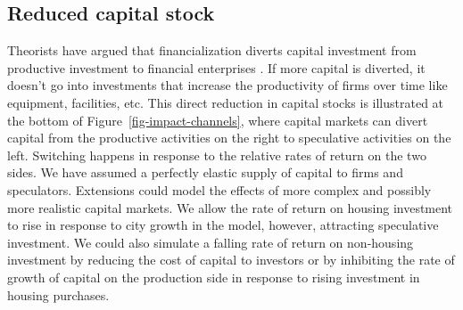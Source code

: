 




\subsection{Reduced capital stock}
Theorists have argued that financialization diverts capital investment from productive investment to financial enterprises \cite{lefebvreRevolutionUrbaine1970, harveyClassmonopolyRentFinance1974, harveyUrbanProcessCapitalism1978, christophersRevisitingUrbanizationCapital2011}. %
If more capital is diverted, it doesn't go into investments that increase the productivity of firms over time like equipment, facilities, etc. This direct reduction in \glspl{capital stock} %
is illustrated at the bottom of Figure~\ref{fig-impact-channels}, where \glspl{capital market} can divert capital from the productive activities on the right to speculative activities on the left. Switching happens in response to the relative rates of return on the two sides. We have assumed a perfectly elastic supply of capital to firms and speculators. Extensions could model the effects of more complex and possibly more realistic capital markets. We allow the rate of return on housing investment to rise in response to city growth in the model, however, attracting speculative investment. We could also simulate a falling rate of return on non-housing investment by reducing the cost of capital to investors or by inhibiting the rate of growth of capital on the production side in response to rising investment in housing purchases. 


